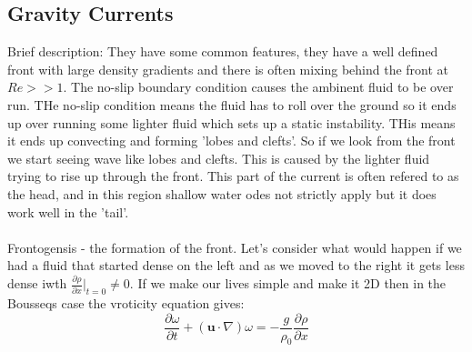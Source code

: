 \documentclass{article}
\begin{document}
\subsection{Gravity Currents}
Brief description: They have some common features, they have a well defined front with large density gradients and there is often mixing behind the front at $Re >>1$. The no-slip boundary condition causes the ambinent fluid to be over run. THe no-slip condition means the fluid has to roll over the ground so it ends up over running some lighter fluid which sets up a static instability. THis means it ends up convecting and forming 'lobes and clefts'. So if we look from the front we start seeing wave like lobes and clefts. This is caused by the lighter fluid trying to rise up through the front. This part of the current is often refered to as the head, and in this region shallow water odes not strictly apply but it does work well in the 'tail'.\\\\
Frontogensis - the formation of the front. Let's consider what would happen if we had a fluid that started dense on the left and as we moved to the right it gets less dense iwth $\frac{\partial \rho}{\partial x}|_{t=0} \neq 0$. If we make our lives simple and make it 2D then in the Bousseqs case the vroticity equation gives:
$$
 \frac{\partial \omega}{\partial t} + ( \bm u \cdot \nabla) \omega = - \frac{g}{\rho_0}\frac{\partial \rho}{\partial x}
$$
\end{document}
